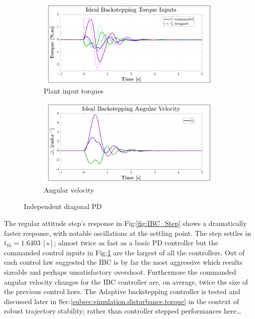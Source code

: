 \begin{figure}[htbp]\ContinuedFloat
\begin{subfigure}{0.49\textwidth}
\centering
\includegraphics[width=\textwidth]{graphs/IBC_Torque}
\caption{Plant input torques}
\label{fig:IBC_Torque}
\end{subfigure}
\begin{subfigure}{0.49\textwidth}
\centering
\includegraphics[width=\textwidth]{graphs/IBC_Angular}
\caption{Angular velocity}
\label{fig:IBC_Angular}
\end{subfigure}
\vspace{-6pt}
\caption{Independent diagonal PD}
\vspace{-12pt}
\end{figure}
\par
The regular attitude step's response in Fig:\ref{fig:IBC_Step} shows a dramatically faster response, with notable oscillations at the settling point. The step settles in $t_{95}=1.6403~[\text{s}]$; almost twice as fast as a basic PD controller but the commanded control inputs in Fig:\ref{fig:IBC_Torque} are the largest of all the controllers. Out of each control law suggested the IBC is by far the most aggressive which results sizeable and perhaps unsatisfactory overshoot. Furthermore the commanded angular velocity changes for the IBC controller are, on average, twice the size of the previous control laws. The Adaptive backstepping controller is tested and discussed later in Sec:\ref{subsec:simulation.disturbance.torque} in the context of robust trajectory stability; rather than controller stepped performances here\ldots 
